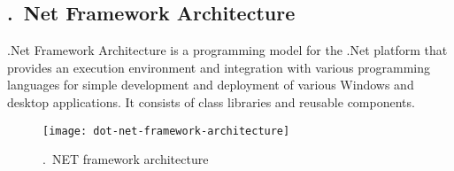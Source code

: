 %
%
%


\subsection{.\ Net Framework Architecture}
.Net Framework Architecture is a programming model for the .Net platform that provides an execution environment and integration with various programming languages for simple development and deployment of various Windows and desktop applications. It consists of class libraries and reusable components.
\begin{figure}[ht!]
	\centering
	\texttt{[image: dot-net-framework-architecture]}
	\caption{.\ NET framework architecture}\label{fig:dot-net-architecture}
\end{figure}

